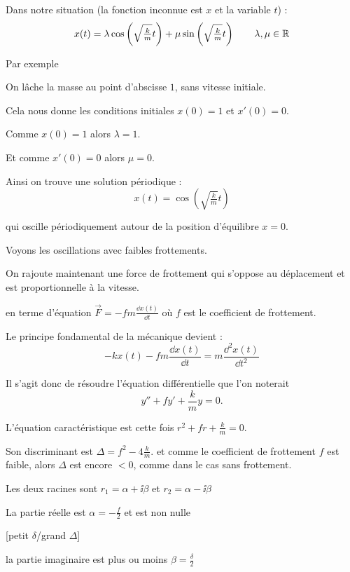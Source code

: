\change
Dans notre situation (la fonction inconnue est $x$ et la variable $t$) :
$$x(t) = \lambda\cos \left(\sqrt{\tfrac{k}{m}}t\right)
+\mu\sin \left(\sqrt{\tfrac{k}{m}}t\right)
\qquad \lambda, \mu \in \mathbb{R}$$

\diapo

Par exemple 

\change
On lâche la masse au point d'abscisse $1$, sans vitesse initiale. 

\change
Cela nous donne les conditions initiales 
$x(0)=1$ et $x'(0)=0$.

\change
Comme $x(0)=1$ alors $\lambda=1$. 

\change
Et comme $x'(0) = 0$ alors $\mu = 0$.

\change
Ainsi on trouve une solution périodique :
$$x(t) = \cos \left(\sqrt{\tfrac{k}{m}}t\right)$$

qui oscille périodiquement autour de la position d'équilibre $x=0$.

\diapo

Voyons les oscillations avec faibles frottements.

\change
On rajoute maintenant une force de frottement qui s'oppose au déplacement 
et est proportionnelle à la vitesse.

\change
en terme d'équation  $\vec F =  -fm \frac{\dd x(t)}{\dd t}$
où $f$ est le coefficient de frottement.

\change
Le principe fondamental de la mécanique devient :
$$-kx(t)-fm \frac{\dd x(t)}{\dd t} = m\frac{\dd^2 x(t)}{\dd t^2}$$

\change
Il s'agit donc de résoudre l'équation différentielle que l'on noterait
$$y'' + f y' + \frac{k}{m} y = 0.$$  

\change
L'équation caractéristique est cette fois $r^2+fr+\frac{k}{m}=0$.

\change
Son discriminant est  $\Delta = f^2-4\frac{k}{m}$.
et comme le coefficient de frottement $f$ est faible, 
alors $\Delta$ est encore $<0$, comme dans le cas sans frottement.

\change
Les deux racines sont 
$r_1 = \alpha + \ii \beta$ et $r_2 = \alpha - \ii \beta$

\change
La partie réelle est $\alpha = -\frac{f}{2}$ et est non nulle


[petit $\delta$/grand $\Delta$]

la partie imaginaire est plus ou moins
$\beta = \frac{\delta}{2}$

